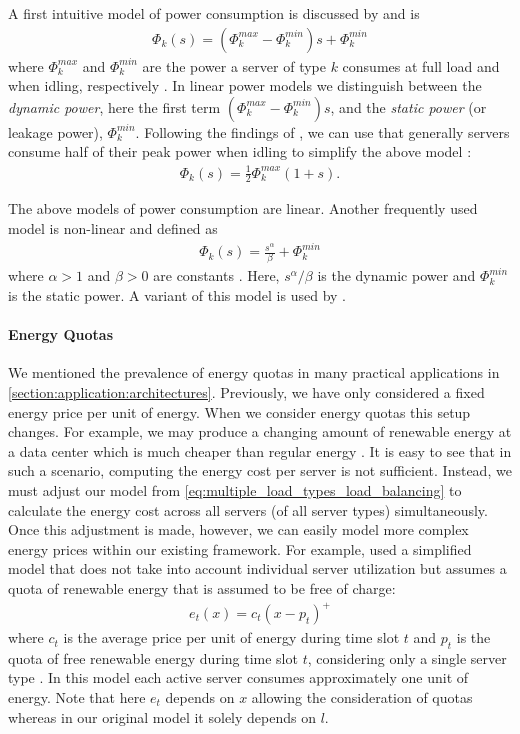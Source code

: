 A first intuitive model of power consumption is discussed by \citeauthor*{Dayarathna2016} and \citeauthor*{Ismail2020} is \begin{align*}
    \Phi_k(s) = (\Phi_k^{max} - \Phi_k^{min})s + \Phi_k^{min}
\end{align*} where $\Phi_k^{max}$ and $\Phi_k^{min}$ are the power a server of type $k$ consumes at full load and when idling, respectively \cite{Dayarathna2016, Ismail2020}. In linear power models we distinguish between the \emph{dynamic power}, here the first term $(\Phi_k^{max} - \Phi_k^{min})s$, and the \emph{static power} (or leakage power), $\Phi_k^{min}$. Following the findings of \citeauthor*{Barroso2007}, we can use that generally servers consume half of their peak power when idling to simplify the above model \cite{Barroso2007, Ismail2020}: \begin{align*}
    \Phi_k(s) = \frac{1}{2} \Phi_k^{max} (1 + s).
\end{align*}

The above models of power consumption are linear. Another frequently used model is non-linear and defined as \begin{align*}
    \Phi_k(s) = \frac{s^{\alpha}}{\beta} + \Phi_k^{min}
\end{align*} where $\alpha > 1$ and $\beta > 0$ are constants \cite{Dayarathna2016}. Here, $s^{\alpha}/\beta$ is the dynamic power and $\Phi_k^{min}$ is the static power. A variant of this model is used by \citeauthor*{Bansal2015} \cite{Bansal2015}.

\paragraph{Energy Quotas} We mentioned the prevalence of energy quotas in many practical applications in \autoref{section:application:architectures}. Previously, we have only considered a fixed energy price per unit of energy. When we consider energy quotas this setup changes. For example, we may produce a changing amount of renewable energy at a data center which is much cheaper than regular energy \cite{Lin2012}. It is easy to see that in such a scenario, computing the energy cost per server is not sufficient. Instead, we must adjust our model from \autoref{eq:multiple_load_types_load_balancing} to calculate the energy cost across all servers (of all server types) simultaneously. Once this adjustment is made, however, we can easily model more complex energy prices within our existing framework. For example, \citeauthor*{Lin2012} used a simplified model that does not take into account individual server utilization but assumes a quota of renewable energy that is assumed to be free of charge: \begin{align*}
    e_t(x) = c_{t}(x - p_t)^+
\end{align*} where $c_t$ is the average price per unit of energy during time slot $t$ and $p_t$ is the quota of free renewable energy during time slot $t$, considering only a single server type \cite{Lin2012}. In this model each active server consumes approximately one unit of energy. Note that here $e_t$ depends on $x$ allowing the consideration of quotas whereas in our original model it solely depends on $l$.

